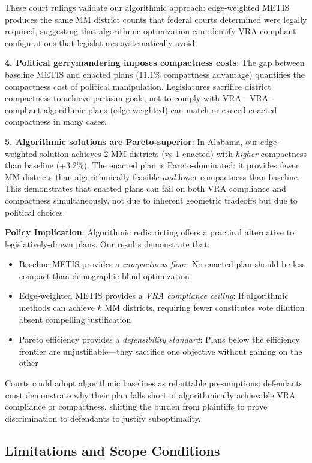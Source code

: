 These court rulings validate our algorithmic approach: edge-weighted METIS produces the same MM district counts that federal courts determined were legally required, suggesting that algorithmic optimization can identify VRA-compliant configurations that legislatures systematically avoid.

\textbf{4. Political gerrymandering imposes compactness costs}: The gap between baseline METIS and enacted plans (11.1\% compactness advantage) quantifies the compactness cost of political manipulation. Legislatures sacrifice district compactness to achieve partisan goals, not to comply with VRA---VRA-compliant algorithmic plans (edge-weighted) can match or exceed enacted compactness in many cases.

\textbf{5. Algorithmic solutions are Pareto-superior}: In Alabama, our edge-weighted solution achieves 2 MM districts (vs 1 enacted) with \emph{higher} compactness than baseline (+3.2\%). The enacted plan is Pareto-dominated: it provides fewer MM districts than algorithmically feasible \emph{and} lower compactness than baseline. This demonstrates that enacted plans can fail on both VRA compliance and compactness simultaneously, not due to inherent geometric tradeoffs but due to political choices.

\textbf{Policy Implication}: Algorithmic redistricting offers a practical alternative to legislatively-drawn plans. Our results demonstrate that:
\begin{itemize}
    \item Baseline METIS provides a \emph{compactness floor}: No enacted plan should be less compact than demographic-blind optimization
    \item Edge-weighted METIS provides a \emph{VRA compliance ceiling}: If algorithmic methods can achieve $k$ MM districts, requiring fewer constitutes vote dilution absent compelling justification
    \item Pareto efficiency provides a \emph{defensibility standard}: Plans below the efficiency frontier are unjustifiable---they sacrifice one objective without gaining on the other
\end{itemize}

Courts could adopt algorithmic baselines as rebuttable presumptions: defendants must demonstrate why their plan falls short of algorithmically achievable VRA compliance or compactness, shifting the burden from plaintiffs to prove discrimination to defendants to justify suboptimality.

\subsection{Limitations and Scope Conditions}

